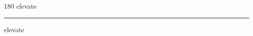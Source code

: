 
\begin{frame}
\begin{center}
\begin{turn}{180}
{\fontsize{2.5cm}{1em}\selectfont elevate}
\end{turn}
\vspace{1em}\par  
\hrule
\vspace{1em}\par  
{\fontsize{2.5cm}{1em}\selectfont elevate}
\end{center}
\end{frame}
